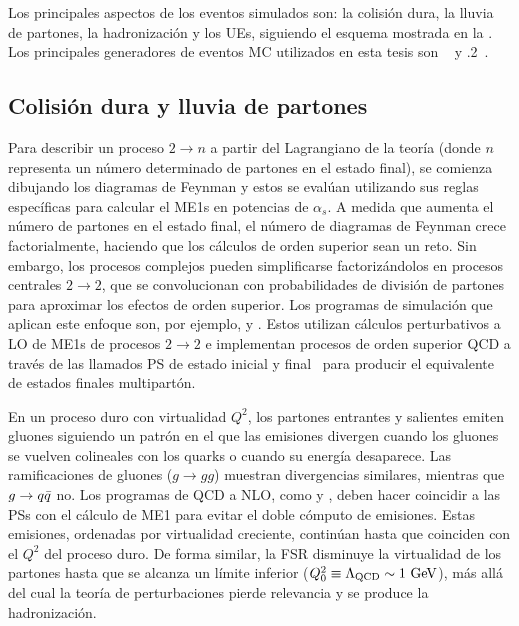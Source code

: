 Los principales aspectos de los eventos simulados son: la colisi\'on dura, la lluvia de partones, la hadronización y los \acp{UE}, siguiendo el esquema mostrada en la \Fig{\ref{fig:theory:sm:hadron_interactions:parton_shower}}.
Los principales generadores de eventos \ac{MC} utilizados en esta tesis son ~\cite{Pythia8.1,Pythia8.2,Pythia8.3} y .2~\cite{Sherpa2.2}.

\subsection{Colisi\'on dura y lluvia de partones}

Para describir un proceso \(2 \to n\) a partir del Lagrangiano de la teoría (donde \(n\) representa un número determinado de partones en el estado final), se comienza dibujando los diagramas de Feynman y estos se evalúan utilizando sus reglas específicas para calcular el \acp{ME1} en potencias de \(\alpha_s\). A medida que aumenta el número de partones en el estado final, el número de diagramas de Feynman crece factorialmente, haciendo que los cálculos de orden superior sean un reto. Sin embargo, los procesos complejos pueden simplificarse factorizándolos en procesos centrales \(2 \to 2\), que se convolucionan con probabilidades de división de partones para aproximar los efectos de orden superior. Los programas de simulación que aplican este enfoque son, por ejemplo, \pythia y \Herwig. Estos utilizan cálculos perturbativos a \ac{LO} de \acp{ME1} de procesos \(2 \to 2\) e implementan procesos de orden superior \ac{QCD} a través de las llamados \ac{PS} de estado inicial y final~\cite{Sjostrand-2006,Dobbs-2004} para producir el equivalente de estados finales multipartón.

En un proceso duro con virtualidad \(Q^2\), los partones entrantes y salientes emiten gluones siguiendo un patrón en el que las emisiones divergen cuando los gluones se vuelven colineales con los quarks o cuando su energía desaparece. Las ramificaciones de gluones (\(g \to gg\)) muestran divergencias similares, mientras que \(g \rightarrow q\bar{q}\) no. Los programas de \ac{QCD} a \ac{NLO}, como \Sherpa y \POWHEG, deben hacer coincidir a las \acp{PS} con el cálculo de \ac{ME1} para evitar el doble cómputo de emisiones. Estas emisiones, ordenadas por virtualidad creciente, continúan hasta que coinciden con el \(Q^2\) del proceso duro. De forma similar, la \ac{FSR} disminuye la virtualidad de los partones hasta que se alcanza un límite inferior (\(Q^2_0 \equiv \Lambda_{\text{QCD}} \sim 1~\text{GeV}\)), más allá del cual la teoría de perturbaciones pierde relevancia y se produce la hadronización.

